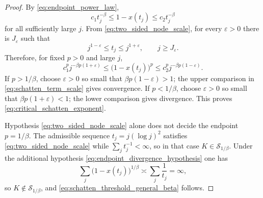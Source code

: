 \documentclass[preprint,12pt]{elsarticle}
\numberwithin{equation}{section}
\theoremstyle{plain}
\theoremstyle{definition}
\theoremstyle{remark}
\begin{document}
\begin{proof}
By \eqref{eq:endpoint_power_law},
\begin{equation}
c_1 t_j^{-\beta}\le 1-x(t_j)\le c_2 t_j^{-\beta}
\end{equation}
for all sufficiently large $j$. From \eqref{eq:two_sided_node_scale}, for every $\varepsilon>0$ there is $J_\varepsilon$ such that
\begin{equation}
j^{1-\varepsilon}\le t_j\le j^{1+\varepsilon},
\qquad j\ge J_\varepsilon.
\label{eq:two_sided_power_bounds}
\end{equation}
Therefore, for fixed $p>0$ and large $j$,
\begin{equation}
c_1^p j^{-\beta p(1+\varepsilon)}
\le
\bigl(1-x(t_j)\bigr)^p
\le
c_2^p j^{-\beta p(1-\varepsilon)}.
\label{eq:schatten_term_scale}
\end{equation}
If $p>1/\beta$, choose $\varepsilon>0$ so small that $\beta p(1-\varepsilon)>1$; the upper comparison in \eqref{eq:schatten_term_scale} gives convergence. If $p<1/\beta$, choose $\varepsilon>0$ so small that $\beta p(1+\varepsilon)<1$; the lower comparison gives divergence. This proves \eqref{eq:critical_schatten_exponent}.

Hypothesis \eqref{eq:two_sided_node_scale} alone does not decide the endpoint $p=1/\beta$. The admissible sequence $t_j=j(\log j)^2$ satisfies \eqref{eq:two_sided_node_scale} while $\sum_j t_j^{-1}<\infty$, so in that case $K\in\mathcal S_{1/\beta}$. Under the additional hypothesis \eqref{eq:endpoint_divergence_hypothesis} one has
\begin{equation}
\sum_j\bigl(1-x(t_j)\bigr)^{1/\beta}\asymp\sum_j\frac1{t_j}=\infty,
\end{equation}
so $K\notin\mathcal S_{1/\beta}$, and \eqref{eq:schatten_threshold_general_beta} follows.
\end{proof}
\end{document}
